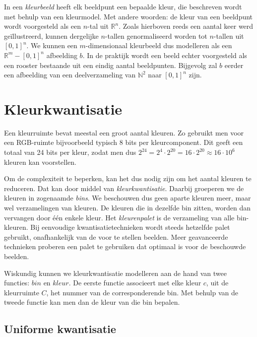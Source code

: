 In een \emph{kleurbeeld} heeft elk beeldpunt een bepaalde kleur, die beschreven wordt met
behulp van een kleurmodel. Met andere woorden: de kleur van een beeldpunt wordt voorgesteld 
als een $n$-tal uit
$\mathbb{R}^n$. Zoals hierboven reeds een aantal keer werd ge\"illustreerd, kunnen dergelijke 
$n$-tallen genormaliseerd worden tot $n$-tallen uit $[0,1]^n$. We kunnen een $m$-dimensionaal 
kleurbeeld dus modelleren als een $\mathbb{R}^m - [0,1]^n$ afbeelding $b$. 
In de praktijk wordt een beeld echter voorgesteld als een rooster bestaande uit een
eindig aantal beeldpunten. Bijgevolg zal $b$ eerder een afbeelding van een deelverzameling van $\mathbb{N}^2$
naar $[0,1]^n$ zijn.

\section{Kleurkwantisatie}
\label{sectie:kleurkwantisatie}

Een kleurruimte bevat meestal een groot aantal 
kleuren. Zo gebruikt men voor een RGB-ruimte bijvoorbeeld typisch 8 bits per 
kleurcomponent. Dit geeft een totaal van 24 bits per kleur, zodat men dus 
$2^{24}=2^4 \cdot 2^{20}=16 \cdot 2^{20} \approx 16 \cdot 10^6$ kleuren kan 
voorstellen.

Om de complexiteit te beperken, kan het dus nodig zijn om het aantal kleuren te 
reduceren. Dat kan door middel van \emph{kleurkwantisatie}. Daarbij groeperen we de kleuren in 
zogenaamde \emph{bins}. We beschouwen dus geen aparte kleuren meer, maar wel 
verzamelingen van kleuren. De kleuren die in dezelfde bin zitten, worden dan 
vervangen door \'e\'en enkele kleur. Het \emph{kleurenpalet} is de verzameling 
van alle bin-kleuren. Bij eenvoudige kwantisatietechnieken wordt steeds 
hetzelfde palet gebruikt, onafhankelijk van de voor te stellen beelden. Meer 
geavanceerde technieken proberen een palet te gebruiken dat optimaal is voor de 
beschouwde beelden.

Wiskundig kunnen we kleurkwantisatie modelleren aan de hand van twee functies: 
$bin$ en $kleur$. De eerste functie associeert met elke kleur $c$, uit de 
kleurruimte $C$, het nummer van de corresponderende bin. Met behulp van de 
tweede functie kan men dan de kleur van die bin bepalen.

\subsection{Uniforme kwantisatie}

